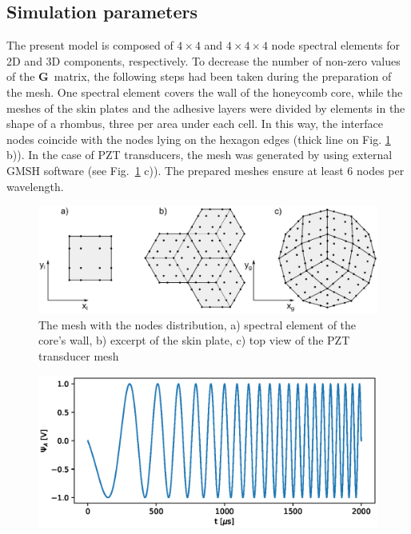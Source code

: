 \documentclass[materials,article,submit,moreauthors,pdftex]{Definitions/mdpi}
\providecommand{\DIFadd}[1]{{\protect\color{blue}{#1}}} %
\providecommand{\DIFaddbegin}{} %
\providecommand{\DIFaddFL}[1]{\DIFadd{#1}} %
\begin{document}
\subsection{Simulation parameters}
\label{sec:simulation}
The present model is composed of \(4 \times 4\) and \(4 \times 4 \times 4\) node spectral elements for 2D and 3D components, respectively.
To decrease the number of non-zero values of the \(\textbf{G}\)~matrix, the following steps had been taken during the preparation of the mesh.
One spectral element covers the wall of the honeycomb core, while the meshes of the skin plates and the adhesive layers were divided by elements in the shape of a rhombus, three per area under each cell.
In this way, the interface nodes coincide with the nodes lying on the hexagon edges (thick line on Fig. \ref{fig:skin_mesh} b)).
In the case of PZT transducers, the mesh was generated by using external GMSH software \cite{geuzaine2009gmsh} (see Fig.~\ref{fig:skin_mesh} c)).
The prepared meshes ensure at least 6 nodes per wavelength.
\begin{figure}
	\begin{center}
		\includegraphics[width=1\linewidth]{../../figures/eps/skin_mesh.eps}
	\end{center}
	\caption{The mesh with the nodes distribution, a) spectral element of the core's wall, b) excerpt of the skin plate, c) top view of the PZT transducer mesh}
	\label{fig:skin_mesh}
\end{figure}
\DIFaddbegin \begin{figure}
	\begin{center}
		\includegraphics[width=1\linewidth]{../../figures/eps/chirp_0_20.eps}
	\end{center}
	\caption{\DIFaddFL{Chirp signal}}
	\label{fig:chirp}
\end{figure}
\end{document}
